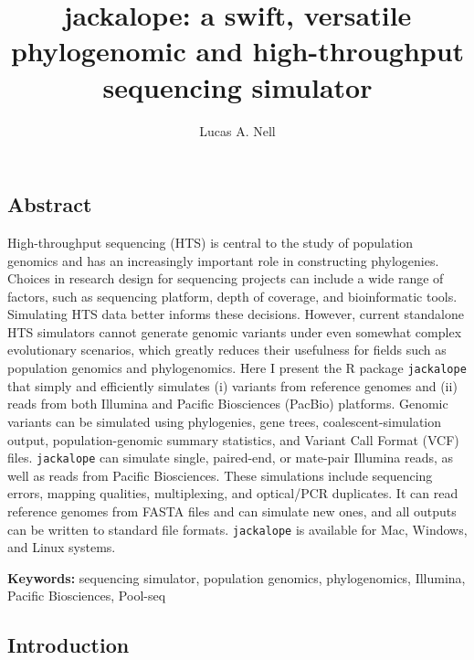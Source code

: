 \documentclass[12pt,]{article}
\title{
    jackalope: a swift, versatile phylogenomic and high-throughput sequencing simulator
            }
\author[1]{Lucas A. Nell}
\affil[1]{Department of Integrative Biology, University of Wisconsin--Madison}
\date{}
\makeatletter
\def\maketitle{{%
  \renewenvironment{tabular}[2][]
    {\begin{flushleft}}
    {\end{flushleft}}
  \AB@maketitle}}
\makeatother
\begin{document}
            \maketitle




\raggedright

\hypertarget{abstract}{%
\subsection{Abstract}\label{abstract}}

High-throughput sequencing (HTS) is central to the study of population genomics
and has an increasingly important role in constructing phylogenies.
Choices in research design for sequencing projects can include
a wide range of factors, such as sequencing platform, depth of coverage, and
bioinformatic tools.
Simulating HTS data better informs these decisions.
However, current standalone HTS simulators cannot generate genomic variants under
even somewhat complex evolutionary scenarios, which greatly reduces their usefulness
for fields such as population genomics and phylogenomics.
Here I present the R package \texttt{jackalope} that simply and efficiently simulates
(i) variants from reference genomes and
(ii) reads from both Illumina and Pacific Biosciences (PacBio) platforms.
Genomic variants can be simulated using phylogenies, gene trees,
coalescent-simulation output, population-genomic summary statistics,
and Variant Call Format (VCF) files.
\texttt{jackalope} can simulate single, paired-end, or mate-pair Illumina reads,
as well as reads from Pacific Biosciences.
These simulations include sequencing errors, mapping qualities, multiplexing,
and optical/PCR duplicates.
It can read reference genomes from FASTA files and can simulate new ones,
and all outputs can be written to standard file formats.
\texttt{jackalope} is available for Mac, Windows, and Linux systems.

\textbf{Keywords:} sequencing simulator, population genomics, phylogenomics,
Illumina, Pacific Biosciences, Pool-seq

\hypertarget{introduction}{%
\subsection{Introduction}\label{introduction}}
\end{document}
